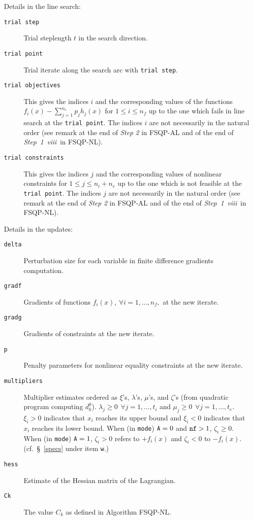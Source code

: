 Details in the line search:
\begin{description}
\item[\tt trial step]  Trial steplength $t$ in the search direction.
\item[\tt trial point] Trial iterate along the search arc 
                       with {\tt trial step}.
\item[\tt trial objectives] This gives the indices $i$ and 
                            the corresponding
                            values of the functions 
                   $f_i(x)-\sum_{j=1}^{n_e}p_jh_j(x)$
                   for $1\leq i \leq n_f$ up to the one which fails 
                   in line search at the {\tt trial point}. The 
                   indices $i$
                   are not necessarily in the natural order (see
                   remark at the end of {\it Step 2} in FSQP-AL and of
                   the end of {\it Step~1~viii}\ in FSQP-NL).
\item[\tt trial constraints] This gives the indices $j$ and the 
                   corresponding values of nonlinear constraints 
                   for $1\leq j \leq n_i+n_e$ up to the 
                   one which is not feasible at the {\tt trial point}.
                   The indices $j$
                   are not necessarily in the natural order (see
                   remark at the end of {\it Step 2} in FSQP-AL and of
                   the end of {\it Step~1~viii}\ in FSQP-NL).
\end{description}

Details in the updates:
\begin{description}
\item[\tt delta]  Perturbation size for each variable 
                  in finite difference gradients computation.
\item[\tt gradf]  Gradients of 
                  functions $f_i(x),~\forall i=1,\ldots,n_f,$ 
                  at the new iterate.
\item[\tt gradg]  Gradients of constraints at the new iterate.
\item[\tt p]      Penalty parameters for nonlinear equality constraints at
                  the new iterate.
\item[\tt multipliers] Multiplier estimates ordered as $\xi$'s, 
        $\lambda$'s, $\mu$'s, and $\zeta$'s (from quadratic program
        computing $d^0_k$). $\lambda _j \geq 0~~\forall j=1,\ldots,t_i$
        and $\mu _j \ge 0~~\forall j=1,\ldots,t_e$. $\xi _i > 0$
        indicates that $x_i$ reaches its upper bound and $\xi _i <0$
        indicates that $x_i$ reaches its lower bound. When
        (in {\tt mode}) ${\tt A}=0$ and ${\tt nf}>1$, $\zeta _i \geq0$.
        When (in {\tt mode}) ${\tt A}=1$, $\zeta _i >0$ refers to
        $+f_i(x)$ and $\zeta _i<0$ to $-f_i(x)$. 
       (cf.\ \S~\ref{specs} under item {\tt w}.)
\item[\tt hess]   Estimate of the Hessian matrix of the Lagrangian.
\item[\tt Ck]     The value $C_k$ as defined in Algorithm FSQP-NL.
\end{description}

